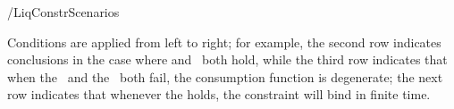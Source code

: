 \documentclass[\econtexRoot/BufferStockTheory]{subfiles}
\begin{document}
\begin{verbatimwrite}{\TableDir/LiqConstrScenarios}
\begin{table}[b]
\settowidth\TableWidth{\usebox{\LiqConstrScenarios}}
\usebox{\LiqConstrScenarios}

\parbox{\TableWidth}{\footnotesize Conditions are applied from left to right; for example, the second row indicates conclusions in the case where \cncl{\GICRaw} and \RIC~both hold, while the third row indicates that when the \GICRaw~and the \RIC~both fail, the consumption function is degenerate; the next row indicates that whenever the \GICRaw holds, the constraint will bind in finite time.}

\end{table}


\end{verbatimwrite}
\clearpage

\end{document}
